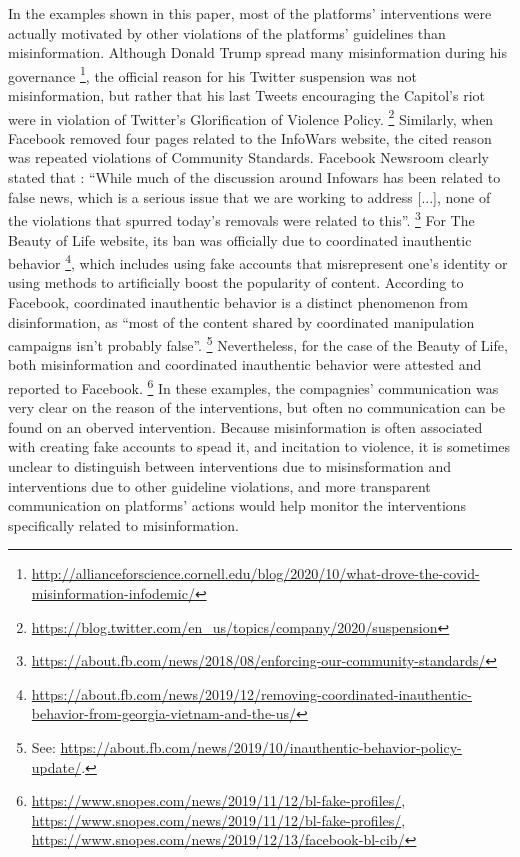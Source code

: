 \documentclass{article}
\begin{document}
\smallskip

In the examples shown in this paper, most of the platforms' interventions were actually motivated by other violations of the platforms' guidelines than misinformation.
Although Donald Trump spread many misinformation during his governance
\footnote{\url{http://allianceforscience.cornell.edu/blog/2020/10/what-drove-the-covid-misinformation-infodemic/}}, 
the official reason for his Twitter suspension was not misinformation, but rather that his last Tweets encouraging the Capitol's riot were in violation of Twitter's Glorification of Violence Policy.
\footnote{\url{https://blog.twitter.com/en_us/topics/company/2020/suspension}}
Similarly, when Facebook removed four pages related to the InfoWars website, the cited reason was repeated violations of Community Standards.
Facebook Newsroom clearly stated that : ``While much of the discussion around Infowars has been related to false news, which is a serious issue that we are working to address [...], none of the violations that spurred today’s removals were related to this''.
\footnote{\url{https://about.fb.com/news/2018/08/enforcing-our-community-standards/}}
For The Beauty of Life website, its ban was officially due to coordinated inauthentic behavior
\footnote{\url{https://about.fb.com/news/2019/12/removing-coordinated-inauthentic-behavior-from-georgia-vietnam-and-the-us/}}, 
which includes using fake accounts that misrepresent one's identity or using methods to artificially boost the popularity of content. 
According to Facebook, coordinated inauthentic behavior is a distinct phenomenon from disinformation, as ``most of the content shared by coordinated manipulation campaigns isn’t probably false''.
\footnote{See: \href{https://about.fb.com/news/2019/10/inauthentic-behavior-policy-update/}{https://about.fb.com/news/2019/10/inauthentic-behavior-policy-update/}.} 
Nevertheless, for the case of the Beauty of Life, both misinformation and coordinated inauthentic behavior were attested and reported to Facebook.
\footnote{\href{ https://www.snopes.com/news/2019/11/12/bl-fake-profiles/}{https://www.snopes.com/news/2019/11/12/bl-fake-profiles/}, 
\href{https://www.snopes.com/news/2019/11/12/bl-fake-profiles/}{https://www.snopes.com/news/2019/11/12/bl-fake-profiles/}, 
\href{https://www.snopes.com/news/2019/12/13/facebook-bl-cib/}{https://www.snopes.com/news/2019/12/13/facebook-bl-cib/}}
In these examples, the compagnies' communication was very clear on the reason of the interventions, but often no communication can be found on an oberved intervention.
Because misinformation is often associated with creating fake accounts to spead it, and incitation to violence, it is sometimes unclear to distinguish between interventions due to misinsformation and interventions due to other guideline violations, and more transparent communication on platforms' actions would help monitor the interventions specifically related to misinformation.
\end{document}
